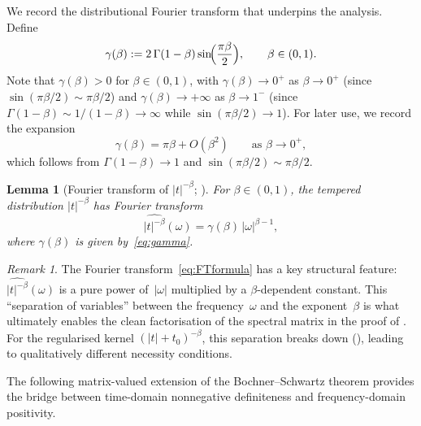 \documentclass[12pt]{article}
\newtheorem{lemma}[theorem]{Lemma}
\theoremstyle{definition}
\theoremstyle{remark}
\newtheorem{remark}[theorem]{Remark}
\begin{document}
We record the distributional Fourier transform that underpins the analysis.
Define
\begin{equation}\label{eq:gamma}
  \gamma(\beta) := 2\,\Gamma(1-\beta)\sin\!\Bigl(\frac{\pi\beta}{2}\Bigr),
  \qquad \beta\in(0,1).
\end{equation}
Note that $\gamma(\beta)>0$ for $\beta\in(0,1)$, with $\gamma(\beta)\to 0^+$
as $\beta\to 0^+$ (since $\sin(\pi\beta/2)\sim \pi\beta/2$)
and $\gamma(\beta)\to+\infty$ as $\beta\to 1^-$
(since $\Gamma(1-\beta)\sim 1/(1-\beta)\to\infty$ while $\sin(\pi\beta/2)\to 1$).
For later use, we record the expansion
\begin{equation}\label{eq:gamma_expansion}
  \gamma(\beta) = \pi\beta + O(\beta^2) \qquad\text{as }\beta\to 0^+,
\end{equation}
which follows from $\Gamma(1-\beta)\to 1$ and $\sin(\pi\beta/2)\sim\pi\beta/2$.

\begin{lemma}[Fourier transform of $|t|^{-\beta}$; {\cite[Ch.~I, \S3.3]{GelfandShilov1964}}]\label{lem:FT}
For $\beta\in(0,1)$, the tempered distribution $|t|^{-\beta}$ has Fourier transform
\begin{equation}\label{eq:FTformula}
  \widehat{|t|^{-\beta}}(\omega) = \gamma(\beta)\,|\omega|^{\beta-1},
\end{equation}
where $\gamma(\beta)$ is given by~\eqref{eq:gamma}.
\end{lemma}

\begin{remark}\label{rem:FT_interpret}
The Fourier transform~\eqref{eq:FTformula} has a key structural feature:
$\widehat{|t|^{-\beta}}(\omega)$ is a pure power of~$|\omega|$ multiplied by
a $\beta$-dependent constant.  This ``separation of variables'' between the
frequency~$\omega$ and the exponent~$\beta$ is what ultimately enables the
clean factorisation of the spectral matrix in the proof of .
For the regularised kernel $(|t|+t_0)^{-\beta}$, this separation breaks down
(), leading to qualitatively different necessity conditions.
\end{remark}

The following matrix-valued extension of the Bochner--Schwartz theorem provides the
bridge between time-domain nonnegative definiteness and frequency-domain positivity.
\end{document}
